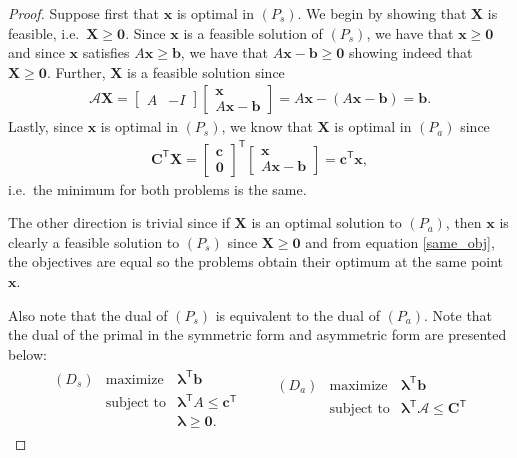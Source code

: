 \documentclass[12pt]{article}
\theoremstyle{definition}
\newcommand{\vc}[1]{\boldsymbol{#1}}
\newcommand{\tran}{\mathsf{T}}
\begin{document}
\begin{proof}
  Suppose first that $\vc{x}$ is optimal in $(P_s)$. We begin by showing that $\vc{X}$ is feasible, i.e.\ $\vc{X} \geq \vc{0}$. Since $\vc{x}$ is a feasible solution of $(P_s)$, we have that $\vc{x} \geq \vc{0}$ and since $\vc{x}$ satisfies $A\vc{x} \geq \vc{b}$, we have that $A\vc{x} - \vc{b} \geq \vc{0}$
  showing indeed that $\vc{X} \geq \vc{0}$. Further, $\vc{X}$ is a feasible solution since
  \begin{align*}
    \mathscr{A}\vc{X} = \begin{bmatrix}A & -I\end{bmatrix}\begin{bmatrix}\vc{x} \\ A\vc{x} - \vc{b}\end{bmatrix} = A\vc{x} -(A\vc{x} - \vc{b}) = \vc{b}.
  \end{align*}
  Lastly, since $\vc{x}$ is optimal in $(P_s)$, we know that $\vc{X}$ is optimal in $(P_a)$ since
  \begin{align}\label{same_obj}
    \vc{C}^\tran\vc{X} = \begin{bmatrix}\vc{c} \\ \vc{0}\end{bmatrix}^\tran\begin{bmatrix}\vc{x} \\ A\vc{x} - \vc{b}\end{bmatrix} = \vc{c}^\tran\vc{x},
  \end{align}
  i.e.\ the minimum for both problems is the same.

  The other direction is trivial since if $\vc{X}$ is an optimal solution to $(P_a)$, then $\vc{x}$ is clearly a feasible solution to $(P_s)$ since $\vc{X} \geq \vc{0}$ and from equation
  \eqref{same_obj}, the objectives are equal so the problems obtain their optimum at the same point $ \vc{x}$.

  Also note that the dual of $(P_s)$ is equivalent to the dual of $(P_a)$. Note that the dual of the primal in the symmetric form and asymmetric form are presented below:
  \begin{align*}
    \begin{array}{lrl}
      (D_s) & \text{maximize} & \vc{\lambda}^\tran \vc{b} \\
      & \text{subject to} & \vc{\lambda}^\tran A \leq \vc{c}^\tran \\
      & & \vc{\lambda} \geq \vc{0}.
    \end{array}
    \qquad
    \begin{array}{lrl}
      (D_a) & \text{maximize} & \vc{\lambda}^\tran \vc{b} \\
      & \text{subject to} & \vc{\lambda}^\tran \mathscr{A} \leq \vc{C}^\tran \\
      & &
    \end{array}
  \end{align*}


\end{proof}
\end{document}

